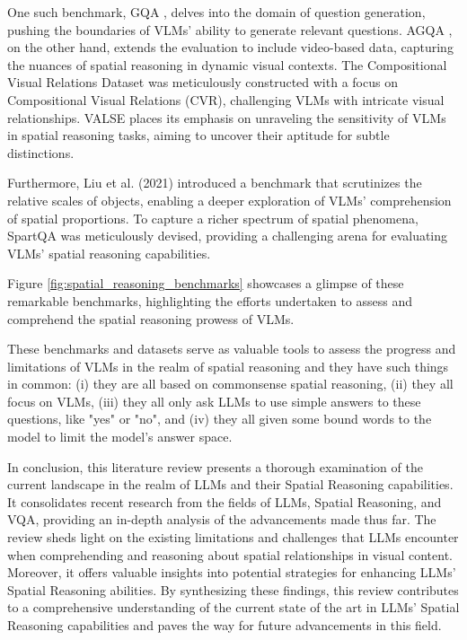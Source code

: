 \documentclass[twocolumn,11pt]{report}
\begin{document}
One such benchmark, GQA \cite{hudson2019gqa}, delves into the domain of question generation, pushing the boundaries of VLMs' ability to generate relevant questions. AGQA \cite{grunde2021agqa}, on the other hand, extends the evaluation to include video-based data, capturing the nuances of spatial reasoning in dynamic visual contexts. The Compositional Visual Relations Dataset \cite{zerroug2022benchmark} was meticulously constructed with a focus on Compositional Visual Relations (CVR), challenging VLMs with intricate visual relationships. VALSE \cite{parcalabescu2021valse} places its emphasis on unraveling the sensitivity of VLMs in spatial reasoning tasks, aiming to uncover their aptitude for subtle distinctions.

Furthermore, Liu et al. (2021) introduced a benchmark \cite{liu2022things} that scrutinizes the relative scales of objects, enabling a deeper exploration of VLMs' comprehension of spatial proportions. To capture a richer spectrum of spatial phenomena, SpartQA \cite{mirzaee2021spartqa} was meticulously devised, providing a challenging arena for evaluating VLMs' spatial reasoning capabilities.

Figure \ref{fig:spatial_reasoning_benchmarks} showcases a glimpse of these remarkable benchmarks, highlighting the efforts undertaken to assess and comprehend the spatial reasoning prowess of VLMs.

These benchmarks and datasets serve as valuable tools to assess the progress and limitations of VLMs in the realm of spatial reasoning and they have such things in common: (i) they are all based on commonsense spatial reasoning, (ii) they all focus on VLMs, (iii) they all only ask LLMs to use simple answers to these questions, like "yes" or "no", and (iv) they all given some bound words to the model to limit the model's answer space.

In conclusion, this literature review presents a thorough examination of the current landscape in the realm of LLMs and their Spatial Reasoning capabilities. It consolidates recent research from the fields of LLMs, Spatial Reasoning, and VQA, providing an in-depth analysis of the advancements made thus far. The review sheds light on the existing limitations and challenges that LLMs encounter when comprehending and reasoning about spatial relationships in visual content. Moreover, it offers valuable insights into potential strategies for enhancing LLMs' Spatial Reasoning abilities. By synthesizing these findings, this review contributes to a comprehensive understanding of the current state of the art in LLMs' Spatial Reasoning capabilities and paves the way for future advancements in this field.
\end{document}
